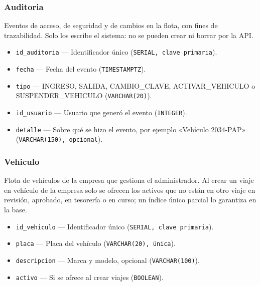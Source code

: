 \documentclass[11pt,letterpaper]{article}
\newcommand{\code}[1]{\nolinkurl{#1}}
\newcommand{\campo}[3]{\item \code{#1} --- #2 (\texttt{#3}).}
\begin{document}
\subsubsection{Auditoria}
Eventos de acceso, de seguridad y de cambios en la flota, con fines de trazabilidad. Solo los escribe el sistema: no se pueden crear ni borrar por la API.
\begin{itemize}
  \campo{id_auditoria}{Identificador único}{SERIAL, clave primaria}
  \campo{fecha}{Fecha del evento}{TIMESTAMPTZ}
  \campo{tipo}{INGRESO, SALIDA, CAMBIO\_CLAVE, ACTIVAR\_VEHICULO o SUSPENDER\_VEHICULO}{VARCHAR(20)}
  \campo{id_usuario}{Usuario que generó el evento}{INTEGER}
  \campo{detalle}{Sobre qué se hizo el evento, por ejemplo «Vehículo 2034-PAP»}{VARCHAR(150), opcional}
\end{itemize}

\subsubsection{Vehiculo}
Flota de vehículos de la empresa que gestiona el administrador. Al crear un viaje en vehículo de la empresa solo se ofrecen los activos que no están en otro viaje en revisión, aprobado, en tesorería o en curso; un índice único parcial lo garantiza en la base.
\begin{itemize}
  \campo{id_vehiculo}{Identificador único}{SERIAL, clave primaria}
  \campo{placa}{Placa del vehículo}{VARCHAR(20), única}
  \campo{descripcion}{Marca y modelo, opcional}{VARCHAR(100)}
  \campo{activo}{Si se ofrece al crear viajes}{BOOLEAN}
\end{itemize}
\end{document}
